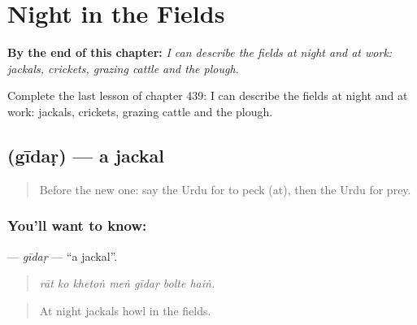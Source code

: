 
\chapter{Night in the Fields}
\label{ch:ur-night-in-the-fields}

\begin{chapteropening}
\textbf{By the end of this chapter:} \emph{I can describe the fields at night and at work: jackals, crickets, grazing cattle and the plough.}

Complete the last lesson of chapter 439: I can describe the fields at night and at work: jackals, crickets, grazing cattle and the plough.
\end{chapteropening}

\section[\texorpdfstring{\ur{گیدڑ} (gīdaṛ)}{گیدڑ (gīdaṛ)}]{ (gīdaṛ) — a jackal}

\label{lesson:UR-C439-gidar}



\begin{quote}
Before the new one: say the Urdu for to peck (at), then the Urdu for prey.
\end{quote}

\subsection*{You'll want to know: }
\textbf{} — \emph{gīdaṛ} — \textquotedblleft{}a jackal\textquotedblright{}.

\begin{quote}
      
\end{quote}

\begin{quote}
\emph{rāt ko khetoṅ meṅ gīdaṛ bolte haiṅ.}
\end{quote}

\begin{quote}
At night jackals howl in the fields.
\end{quote}


